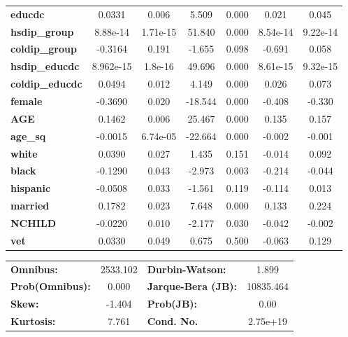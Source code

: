 \documentclass[
  letterpaper,
  DIV=11,
  numbers=noendperiod]{scrartcl}
\begin{document}
\begin{center}
\begin{tabular}{lcccccc}
\textbf{educdc}         &       0.0331  &        0.006     &     5.509  &         0.000        &        0.021    &        0.045     \\
\textbf{hsdip\_group}   &     8.88e-14  &     1.71e-15     &    51.840  &         0.000        &     8.54e-14    &     9.22e-14     \\
\textbf{coldip\_group}  &      -0.3164  &        0.191     &    -1.655  &         0.098        &       -0.691    &        0.058     \\
\textbf{hsdip\_educdc}  &    8.962e-15  &      1.8e-16     &    49.696  &         0.000        &     8.61e-15    &     9.32e-15     \\
\textbf{coldip\_educdc} &       0.0494  &        0.012     &     4.149  &         0.000        &        0.026    &        0.073     \\
\textbf{female}         &      -0.3690  &        0.020     &   -18.544  &         0.000        &       -0.408    &       -0.330     \\
\textbf{AGE}            &       0.1462  &        0.006     &    25.467  &         0.000        &        0.135    &        0.157     \\
\textbf{age\_sq}        &      -0.0015  &     6.74e-05     &   -22.664  &         0.000        &       -0.002    &       -0.001     \\
\textbf{white}          &       0.0390  &        0.027     &     1.435  &         0.151        &       -0.014    &        0.092     \\
\textbf{black}          &      -0.1290  &        0.043     &    -2.973  &         0.003        &       -0.214    &       -0.044     \\
\textbf{hispanic}       &      -0.0508  &        0.033     &    -1.561  &         0.119        &       -0.114    &        0.013     \\
\textbf{married}        &       0.1782  &        0.023     &     7.648  &         0.000        &        0.133    &        0.224     \\
\textbf{NCHILD}         &      -0.0220  &        0.010     &    -2.177  &         0.030        &       -0.042    &       -0.002     \\
\textbf{vet}            &       0.0330  &        0.049     &     0.675  &         0.500        &       -0.063    &        0.129     \\
\bottomrule
\end{tabular}
\begin{tabular}{lclc}
\textbf{Omnibus:}       & 2533.102 & \textbf{  Durbin-Watson:     } &     1.899  \\
\textbf{Prob(Omnibus):} &   0.000  & \textbf{  Jarque-Bera (JB):  } & 10835.464  \\
\textbf{Skew:}          &  -1.404  & \textbf{  Prob(JB):          } &      0.00  \\
\textbf{Kurtosis:}      &   7.761  & \textbf{  Cond. No.          } &  2.75e+19  \\
\bottomrule
\end{tabular}
\end{center}
\end{document}
